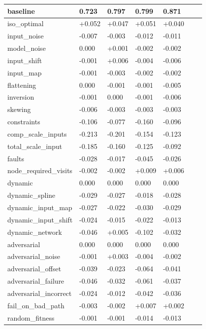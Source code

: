 \documentclass[a4paper]{article}
\begin{document}
\begin{table}[H]
\begin{tabular}{| p{0.2\linewidth} | C{0.12\linewidth} | C{0.12\linewidth} | C{0.12\linewidth} | C{0.12\linewidth} | C{0.12\linewidth} | }
baseline & 0.723 & 0.797 & 0.799 & 0.871 \\ \hline
iso\_optimal & +0.052 & +0.047 & +0.051 & +0.040 \\ \hline
input\_noise & -0.007 & -0.003 & -0.012 & -0.011 \\ \hline
model\_noise & 0.000 & +0.001 & -0.002 & -0.002 \\ \hline
input\_shift & -0.001 & +0.006 & -0.004 & -0.006 \\ \hline
input\_map & -0.001 & -0.003 & -0.002 & -0.002 \\ \hline
flattening & 0.000 & -0.001 & -0.001 & -0.005 \\ \hline
inversion & -0.001 & 0.000 & -0.001 & -0.006 \\ \hline
skewing & -0.006 & -0.003 & -0.003 & -0.003 \\ \hline
constraints & -0.106 & -0.077 & -0.160 & -0.096 \\ \hline
comp\_scale\_inputs & -0.213 & -0.201 & -0.154 & -0.123 \\ \hline
total\_scale\_input & -0.185 & -0.160 & -0.125 & -0.092 \\ \hline
faults & -0.028 & -0.017 & -0.045 & -0.026 \\ \hline
node\_required\_visits & -0.002 & -0.002 & +0.009 & +0.006 \\ \hline
dynamic & 0.000 & 0.000 & 0.000 & 0.000 \\ \hline
dynamic\_spline & -0.029 & -0.027 & -0.018 & -0.028 \\ \hline
dynamic\_input\_map & -0.027 & -0.022 & -0.030 & -0.029 \\ \hline
dynamic\_input\_shift & -0.024 & -0.015 & -0.022 & -0.013 \\ \hline
dynamic\_network & -0.046 & +0.005 & -0.102 & -0.032 \\ \hline
adversarial & 0.000 & 0.000 & 0.000 & 0.000 \\ \hline
adversarial\_noise & -0.001 & +0.003 & -0.004 & -0.002 \\ \hline
adversarial\_offset & -0.039 & -0.023 & -0.064 & -0.041 \\ \hline
adversarial\_failure & -0.046 & -0.032 & -0.061 & -0.037 \\ \hline
adversarial\_incorrect & -0.024 & -0.012 & -0.042 & -0.036 \\ \hline
fail\_on\_bad\_path & -0.003 & -0.002 & +0.007 & +0.002 \\ \hline
random\_fitness & -0.001 & -0.001 & -0.014 & -0.013 \\ \hline


	\end{tabular}
\end{table}
\end{document}
